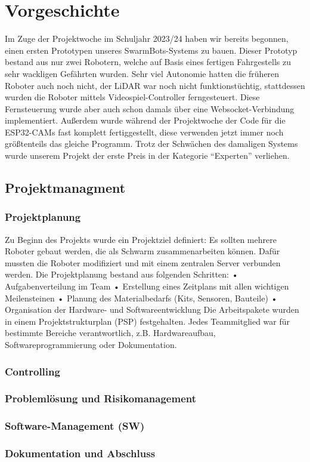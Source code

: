 \chapter{Vorgeschichte}
\label{sec:vorgeschichte}
Im Zuge der Projektwoche im Schuljahr 2023/24 haben wir bereits begonnen,
einen ersten Prototypen unseres SwarmBots-Systems zu bauen.
%
Dieser Prototyp bestand aus nur zwei Robotern,
welche auf Basis eines fertigen Fahrgestells zu sehr wackligen Gefährten wurden.
%
Sehr viel Autonomie hatten die früheren Roboter auch noch nicht,
der LiDAR war noch nicht funktionstüchtig,
stattdessen wurden die Roboter mittels Videospiel-Controller ferngesteuert.
%
Diese Fernsteuerung wurde aber auch schon damals über eine Websocket-Verbindung implementiert.
%
Außerdem wurde während der Projektwoche der Code für die ESP32-CAMs fast komplett fertiggestellt,
diese verwenden jetzt immer noch größtenteils das gleiche Programm.
%
Trotz der Schwächen des damaligen Systems wurde unserem Projekt
der erste Preis in der Kategorie ``Experten'' verliehen.


\section{Projektmanagment}
\label{subsec:projektmanagment}
%
\subsection{Projektplanung}
%
Zu Beginn des Projekts wurde ein Projektziel definiert:
Es sollten mehrere Roboter gebaut werden, die als Schwarm zusammenarbeiten können. Dafür mussten die Roboter modifiziert und mit einem zentralen Server verbunden werden.
Die Projektplanung bestand aus folgenden Schritten:
•	Aufgabenverteilung im Team
•	Erstellung eines Zeitplans mit allen wichtigen Meilensteinen
•	Planung des Materialbedarfs (Kits, Sensoren, Bauteile)
•	Organisation der Hardware- und Softwareentwicklung
Die Arbeitspakete wurden in einem Projektstrukturplan (PSP) festgehalten.
Jedes Teammitglied war für bestimmte Bereiche verantwortlich, z.B. Hardwareaufbau, Softwareprogrammierung oder Dokumentation.
%
\subsection{Controlling}
%
\subsection{Problemlösung und Risikomanagement}
%
\subsection{Software-Management (SW)}
%
\subsection{Dokumentation und Abschluss}